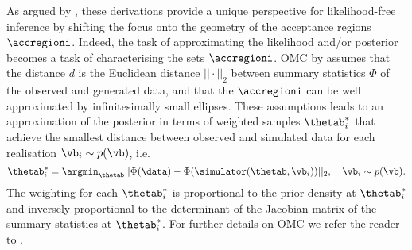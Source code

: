 As argued by \citet{Ikonomov2019}, these derivations provide a unique
perspective for likelihood-free inference by shifting the focus onto
the geometry of the acceptance regions \(\accregioni\). Indeed, the
task of approximating the likelihood and/or posterior becomes a task
of characterising the sets \(\accregioni\). OMC by \citet{Meeds2015}
assumes that the distance \(d\) is the Euclidean distance
\(||\cdot||_2\) between summary statistics \(\Phi\) of the observed
and generated data, and that the \(\accregioni\) can be well
approximated by infinitesimally small ellipses. These assumptions
leads to an approximation of the posterior in terms of weighted
samples \(\thetab_i^*\) that achieve the smallest distance between
observed and simulated data for each realisation
\(\vb_i \sim p(\vb)\), i.e.\
\begin{equation} \label{eq:omc_opt_prob}
\thetab_i^* = \argmin_{\thetab} ||\Phi(\data)-\Phi(\simulator(\thetab, \vb_i))||_2  , \quad \vb_i \sim p(\vb).
\end{equation}
The weighting for each \(\thetab_i^*\) is proportional to the prior
density at \(\thetab_i^*\) and inversely proportional to the determinant
of the Jacobian matrix of the summary statistics at \(\thetab_i^*\). For
further details on OMC we refer the reader to \citep{Meeds2015,
  Ikonomov2019}.

